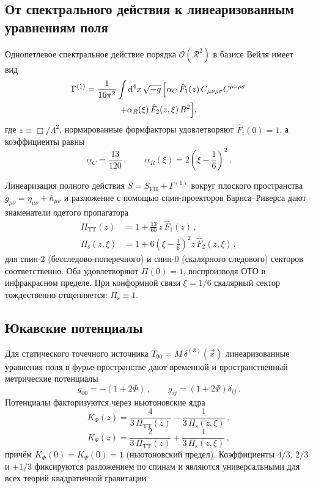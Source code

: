 \documentclass[aps,prd,twocolumn,superscriptaddress,nofootinbib,floatfix]{revtex4-2}
\newcommand{\Weylsq}{C_{\mu\nu\rho\sigma}C^{\mu\nu\rho\sigma}}
\newcommand{\dd}{\mathrm{d}}
\newcommand{\PiTT}{\Pi_{\mathrm{TT}}}
\newcommand{\Pis}{\Pi_{\mathrm{s}}}
\newcommand{\order}{\mathcal{O}}
\begin{document}
\subsection{От спектрального действия к линеаризованным уравнениям поля}

Однопетлевое спектральное действие порядка $\order(\mathcal{R}^2)$ в
базисе Вейля имеет вид~\cite{Alfyorov:2026ff}
\begin{multline}
  \Gamma^{(1)} = \frac{1}{16\pi^2}\int \dd^4x\,\sqrt{-g}\,
  \Bigl[\alpha_C\,\hat{F}_1(z)\,\Weylsq \\
  + \alpha_R(\xi)\,\hat{F}_2(z,\xi)\,R^2\Bigr],
  \label{eq:action}
\end{multline}
где $z \equiv \Box/\Lambda^2$, нормированные формфакторы удовлетворяют
$\hat{F}_i(0) = 1$, а коэффициенты
равны~\cite{Alfyorov:2026ff}
\begin{equation}
  \alpha_C = \frac{13}{120}\,,\qquad
  \alpha_R(\xi) = 2\!\left(\xi - \frac{1}{6}\right)^{\!2}\,.
  \label{eq:alphas}
\end{equation}

Линеаризация полного действия
$S = S_{\mathrm{EH}} + \Gamma^{(1)}$ вокруг плоского пространства
$g_{\mu\nu} = \eta_{\mu\nu} + h_{\mu\nu}$ и разложение с помощью
спин-проекторов Барнса--Риверса дают~\cite{Stelle:1976gc,vanDam:1970vg}
знаменатели одетого пропагатора
\begin{align}
  \PiTT(z) &= 1 + \frac{13}{60}\,z\,\hat{F}_1(z)\,,
  \label{eq:PiTT}\\
  \Pis(z,\xi) &= 1 + 6\!\left(\xi - \frac{1}{6}\right)^{\!2}
    z\,\hat{F}_2(z,\xi)\,,
  \label{eq:Pis}
\end{align}
для спин-2 (бесследово-поперечного) и спин-0 (скалярного следового)
секторов соответственно. Оба удовлетворяют $\Pi(0) = 1$,
воспроизводя ОТО в инфракрасном пределе.
При конформной связи $\xi = 1/6$ скалярный сектор тождественно
отщепляется: $\Pis \equiv 1$.

\subsection{Юкавские потенциалы}

Для статического точечного источника
$T_{00} = M\,\delta^{(3)}(\vec{x})$ линеаризованные уравнения поля
в фурье-пространстве дают временной и пространственный метрические
потенциалы
\begin{equation}
  g_{00} = -(1 + 2\Phi)\,,\qquad
  g_{ij} = (1 + 2\Psi)\delta_{ij}\,.
\end{equation}
Потенциалы факторизуются через ньютоновские ядра
\begin{equation}
  K_\Phi(z) = \frac{4}{3\,\PiTT(z)}
    - \frac{1}{3\,\Pis(z,\xi)}\,,
  \label{eq:KPhi}
\end{equation}
\begin{equation}
  K_\Psi(z) = \frac{2}{3\,\PiTT(z)}
    + \frac{1}{3\,\Pis(z,\xi)}\,,
  \label{eq:KPsi}
\end{equation}
причём $K_\Phi(0) = K_\Psi(0) = 1$ (ньютоновский предел).
Коэффициенты $4/3$, $2/3$ и $\pm 1/3$ фиксируются разложением по
спинам и являются универсальными для всех теорий квадратичной
гравитации~\cite{Stelle:1976gc,Edholm:2016}.
\end{document}
